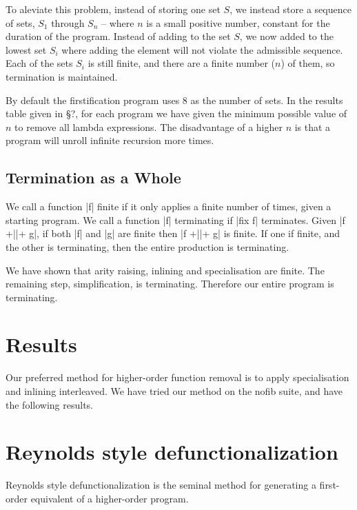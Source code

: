 \documentclass[preprint]{sigplanconf}
\begin{document}
To aleviate this problem, instead of storing one set $S$, we instead store a sequence of sets, $S_1$ through $S_n$ -- where $n$ is a small positive number, constant for the duration of the program. Instead of adding to the set $S$, we now added to the lowest set $S_i$ where adding the element will not violate the admissible sequence. Each of the sets $S_i$ is still finite, and there are a finite number ($n$) of them, so termination is maintained.

By default the firstification program uses 8 as the number of sets. In the results table given in \S?, for each program we have given the minimum possible value of $n$ to remove all lambda expressions. The disadvantage of a higher $n$ is that a program will unroll infinite recursion more times.

\subsection{Termination as a Whole}

We call a function |f| finite if it only applies a finite number of times, given a starting program. We call a function |f| terminating if |fix f| terminates. Given |f +||+ g|, if both |f| and |g| are finite then |f +||+ g| is finite. If one if finite, and the other is terminating, then the entire production is terminating.

We have shown that arity raising, inlining and specialisation are finite. The remaining step, simplification, is terminating. Therefore our entire program is terminating.

\section{Results}

Our preferred method for higher-order function removal is to apply specialisation and inlining interleaved. We have tried our method on the nofib suite, and have the following results.


\section{Reynolds style defunctionalization}

Reynolds style defunctionalization \cite{reynolds:defunc} is the seminal method for generating a first-order equivalent of a higher-order program.
\end{document}
